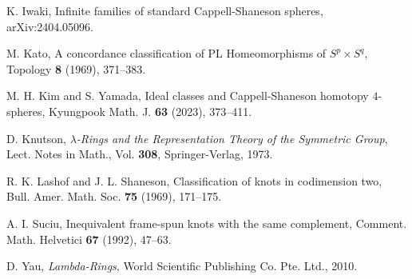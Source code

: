\documentclass{amsart}
\theoremstyle{plain}
\theoremstyle{definition}
\theoremstyle{remark}
\begin{document}
\begin{thebibliography}{99}
\begin{footnotesize}
K. Iwaki, 
Infinite families of standard Cappell-Shaneson spheres, 
arXiv:2404.05096. 

M. Kato, 
A concordance classification of PL Homeomorphisms of $S^p\times S^q$, 
Topology {\bf 8} (1969), 371--383. 

M. H. Kim and S. Yamada, 
Ideal classes and Cappell-Shaneson homotopy $4$-spheres, 
Kyungpook Math. J. {\bf 63} (2023), 373--411. 

D. Knutson, 
{\it $\lambda$-Rings and the Representation Theory of the Symmetric Group}, 
Lect. Notes in Math., Vol. {\bf 308}, Springer-Verlag, 1973. 

R. K. Lashof and J. L. Shaneson, 
Classification of knots in codimension two, 
Bull. Amer. Math. Soc. {\bf 75} (1969), 171--175. 

A. I. Suciu, 
Inequivalent frame-spun knots with the same complement, 
Comment. Math. Helvetici {\bf 67} (1992), 47--63. 

D. Yau, 
{\it Lambda-Rings}, 
World Scientific Publishing Co. Pte. Ltd., 2010. 


\end{footnotesize}%

\end{thebibliography}
\end{document}
